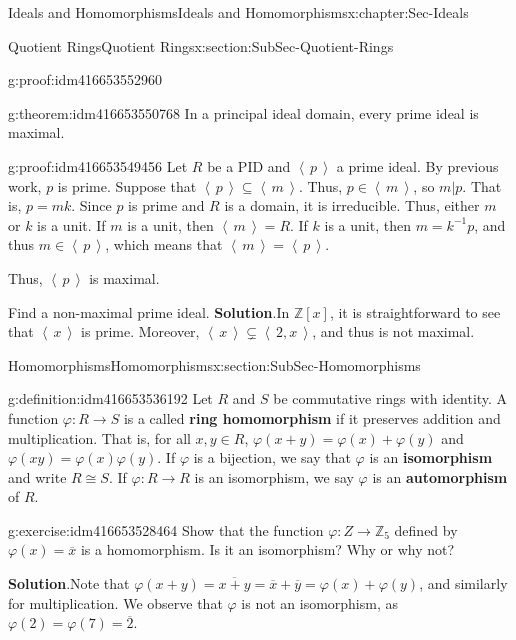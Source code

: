 \documentclass[oneside,10pt,]{book}
\newcommand{\terminology}[1]{\textbf{#1}}
\numberwithin{equation}{section}
\newcommand{\ideal}[1]{\left\langle\, #1 \,\right\rangle}
\def\p{\varphi}
\def\Z{{\mathbb Z}}
\begin{document}
\begin{chapterptx}{Ideals and Homomorphisms}{}{Ideals and Homomorphisms}{}{}{x:chapter:Sec-Ideals}
\begin{sectionptx}{Quotient Rings}{}{Quotient Rings}{}{}{x:section:SubSec-Quotient-Rings}
\begin{proofptx}{}{g:proof:idm416653552960}
\end{proofptx}
\begin{theorem}{}{}{g:theorem:idm416653550768}%
In a principal ideal domain, every prime ideal is maximal.%
\end{theorem}
\begin{proofptx}{}{g:proof:idm416653549456}
Let \(R\) be a PID and \(\ideal{p}\) a prime ideal. By previous work, \(p\) is prime. Suppose that \(\ideal{p} \subseteq \ideal{m}\). Thus, \(p\in \ideal{m}\), so \(m|p\). That is, \(p = mk\). Since \(p\) is prime and \(R\) is a domain, it is irreducible. Thus, either \(m\) or \(k\) is a unit. If \(m\) is a unit, then \(\ideal{m} = R\). If \(k\) is a unit, then \(m = k^{-1} p\), and thus \(m\in \ideal{p}\), which means that \(\ideal{m} = \ideal{p}\).%
\par
Thus, \(\ideal{p}\) is maximal.%
\end{proofptx}
Find a non-maximal prime ideal.%
\textbf{Solution}.\quad{}In \(\Z[x]\), it is straightforward to see that \(\ideal{x}\) is prime. Moreover, \(\ideal{x}\subsetneq \ideal{2,x}\), and thus is not maximal.%
\end{sectionptx}
%
%
\typeout{************************************************}
\typeout{************************************************}
%
\begin{sectionptx}{Homomorphisms}{}{Homomorphisms}{}{}{x:section:SubSec-Homomorphisms}
\begin{definition}{}{g:definition:idm416653536192}%
Let \(R\) and \(S\) be commutative rings with identity. A function \(\p : R\to S\) is a called \terminology{ring homomorphism} if it preserves addition and multiplication. That is, for all \(x,y\in R\), \(\p(x+y) = \p(x) + \p(y)\) and \(\p(xy) = \p(x)\p(y)\). If \(\p\) is a bijection, we say that \(\p\) is an \terminology{isomorphism} and write \(R\cong S\). If \(\p : R\to R\) is an isomorphism, we say \(\p\) is an \terminology{automorphism} of \(R\).%
\end{definition}
\begin{inlineexercise}{}{g:exercise:idm416653528464}%
Show that the function \(\p : Z\to \Z_{5}\) defined by \(\p(x) = \overline{x}\) is a homomorphism. Is it an isomorphism? Why or why not?%
\par\smallskip%
\noindent\textbf{Solution}.\hypertarget{g:solution:idm416653526384}{}\quad{}Note that \(\p(x+y) = \overline{x+y} = \overline{x} + \overline{y} = \p(x) + \p(y)\), and similarly for multiplication. We observe that \(\p\) is not an isomorphism, as \(\p(2) = \p(7) = \overline{2}\).%

\end{inlineexercise}
\end{sectionptx}
\end{chapterptx}
\end{document}
